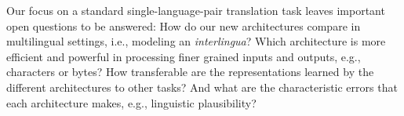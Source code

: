 \documentclass[11pt,a4paper]{article}
\begin{document}
Our focus on a standard single-language-pair translation task leaves
important open questions to be answered:
How do our new architectures compare in multilingual settings, i.e., modeling
an \textit{interlingua}? Which architecture is more efficient and
powerful in processing finer grained inputs and outputs, e.g., characters or
bytes? How transferable are the representations learned by the different
architectures to other tasks? And what are the characteristic errors that
each architecture makes, e.g., linguistic plausibility?



\end{document}
